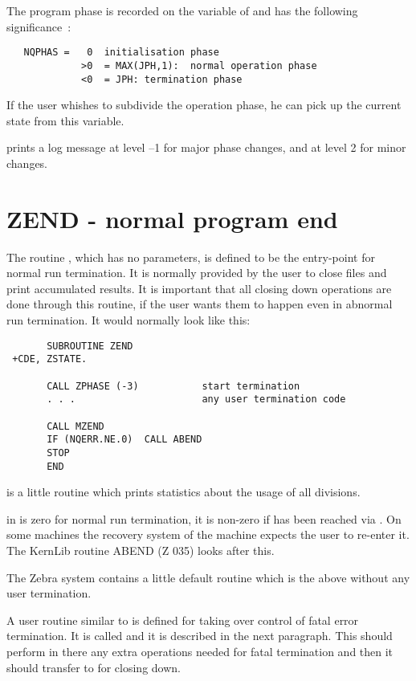 The program phase is recorded on the variable  of 
and has the following significance~:
\begin{verbatim}
   NQPHAS =   0  initialisation phase
             >0  = MAX(JPH,1):  normal operation phase
             <0  = JPH: termination phase
\end{verbatim} 
If the user whishes to subdivide the operation phase,
he can pick up the current state from this variable.

 prints a log message at level --1 for major phase changes,
and at level 2 for minor changes.

\section{ZEND - normal program end}


The routine , which has no parameters, is defined to be the 
entry-point for normal run termination.
It is normally provided by the user
to close files and print accumulated results.
It is important that all closing down operations are
done through this routine,
if the user wants them to happen even in abnormal
run termination.
It would normally look like this:

\begin{verbatim}
       SUBROUTINE ZEND
 +CDE, ZSTATE.

       CALL ZPHASE (-3)           start termination
       . . .                      any user termination code

       CALL MZEND
       IF (NQERR.NE.0)  CALL ABEND
       STOP
       END
\end{verbatim} 

 is a little routine which prints statistics about
the usage of all divisions.

 in  is zero for normal run termination,
it is non-zero if  has been reached via .
On some machines the recovery system of the machine
expects the user to re-enter it.
The KernLib routine ABEND (Z 035) looks after this.

The Zebra system contains a little default routine
 which is the above without any user termination.

A user routine similar to  is defined for taking over control
of fatal error termination. 
It is called  and it is
described in the next paragraph.
This should perform in there any extra operations needed
for fatal termination and then it should transfer
to  for closing down.

